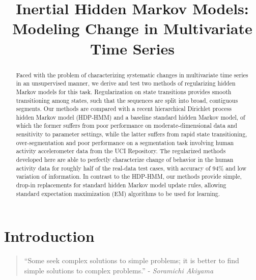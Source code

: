 \documentclass[letterpaper]{article}
\title{Inertial Hidden Markov Models: Modeling Change in Multivariate Time Series}
\newenvironment{dedication}
        {\vspace{0.0ex}\begin{quotation}\begin{center}\begin{em}}
        {\par\end{em}\end{center}\end{quotation}}
\begin{document}
\maketitle

\begin{abstract}
    Faced with the problem of characterizing systematic changes in multivariate
    time series in an unsupervised manner, we derive and test two methods of regularizing hidden
    Markov models for this task. Regularization on state transitions provides
    smooth transitioning among states, such that the sequences are split into
    broad, contiguous segments. Our methods are compared with a recent
    hierarchical Dirichlet process hidden Markov model (HDP-HMM) and a baseline
    standard hidden Markov model, of which the former suffers from poor
    performance on moderate-dimensional data and sensitivity to parameter
    settings, while the latter suffers from rapid state transitioning,
    over-segmentation and poor performance on a segmentation task involving
    human activity accelerometer data from the UCI Repository.
    The regularized methods developed here are able to perfectly characterize
    change of behavior in the human activity data for roughly half of the real-data
    test cases, with accuracy of 94\% and low variation of information. In contrast to the
    HDP-HMM, our methods provide simple, drop-in replacements for standard
    hidden Markov model update rules, allowing standard expectation maximization
    (EM) algorithms to be used for learning. 
\end{abstract}

\section{Introduction}

\begin{dedication} ``Some seek complex solutions to simple problems; it is better to find simple solutions to complex problems.'' - \emph{Soramichi Akiyama}
\end{dedication}
\end{document}
